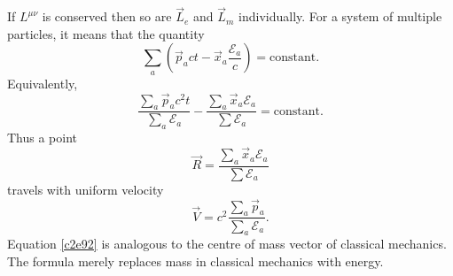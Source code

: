\begin{enumerate}
If $L^{\mu\nu}$ is conserved then so are $\vec{L}_e$ and $\vec{L}_m$ individually.
For a system of multiple particles, it means that the quantity
\begin{equation}\label{c2e90}
\sum_a \left(\vec{p}_act - \vec{x}_a\frac{\mathcal{E}_a}{c}\right) = \text{constant.}
\end{equation}
Equivalently,
\begin{equation}\label{c2e91}
\frac{\sum_a\vec{p}_ac^2t}{\sum_a \mathcal{E}_a} - \frac{\sum_a\vec{x}_a \mathcal{E}_a}{\sum \mathcal{E}_a} = \text{constant.}
\end{equation}
Thus a point
\begin{equation}\label{c2e92}
\vec{R} = \frac{\sum_a\vec{x}_a \mathcal{E}_a}{\sum \mathcal{E}_a}
\end{equation}
travels with uniform velocity
\begin{equation}\label{c2e93}
\vec{V} = c^2\frac{\sum_a\vec{p}_a}{\sum_a \mathcal{E}_a}.
\end{equation}
Equation \eqref{c2e92} is analogous to the centre of mass vector of classical 
mechanics. The formula merely replaces mass in classical mechanics with energy.
\end{enumerate}
